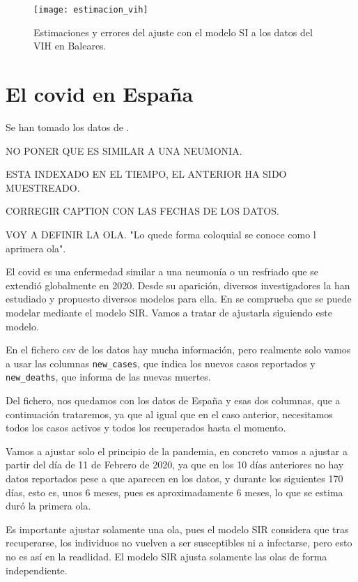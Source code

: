 \begin{figure}
\begin{center}
\caption{Estimaciones y errores del ajuste con el modelo SI a los datos del VIH en Baleares.}
\label{estimacion_vih}
\texttt{[image: estimacion\_vih]}
\end{center}
\end{figure}

\section{El covid en España}

Se han tomado los datos de \cite{datos_covid}.

NO PONER QUE ES SIMILAR A UNA NEUMONIA.

ESTA INDEXADO EN EL TIEMPO, EL ANTERIOR HA SIDO MUESTREADO.

CORREGIR CAPTION CON LAS FECHAS DE LOS DATOS.

VOY A DEFINIR LA OLA. "Lo quede forma coloquial se conoce como l aprimera ola".




El covid es una enfermedad similar a una neumonía o un resfriado que se extendió globalmente en 2020. Desde su aparición, diversos investigadores la han estudiado y propuesto diversos modelos para ella. En \cite{enrique_amaro} se comprueba que se puede modelar mediante el modelo SIR. Vamos a tratar de ajustarla siguiendo este modelo.

En el fichero csv de los datos hay mucha información, pero realmente solo vamos a usar las columnas \verb|new_cases|, que indica los nuevos casos reportados y \verb|new_deaths|, que informa de las nuevas muertes.

Del fichero, nos quedamos con los datos de España y esas dos columnas, que a continuación trataremos, ya que al igual que en el caso anterior, necesitamos todos los casos activos y todos los recuperados hasta el momento.

Vamos a ajustar solo el principio de la pandemia, en concreto vamos a ajustar a partir del día de 11 de Febrero de 2020, ya que en los 10 días anteriores no hay datos reportados pese a que aparecen en los datos, y durante los siguientes 170 días, esto es, unos 6 meses, pues es aproximadamente 6 meses, lo que se estima duró la primera ola.

Es importante ajustar solamente una ola, pues el modelo SIR considera que tras recuperarse, los individuos no vuelven a ser susceptibles ni a infectarse, pero esto no es así en la readlidad. El modelo SIR ajusta solamente las olas de forma independiente.

